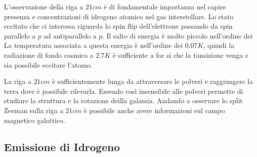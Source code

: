 L'osservazione della riga a $21cm$ \`e di fondamentale importanza nel capire presenza e concentrazioni di idrogeno atomico nel gas interstellare. Lo stato eccitato che ci interessa riguarda lo spin flip dell'elettrone passando da spin parallelo a $p$ ad antiparallelo a $p$. Il salto di energia \`e molto piccolo nell'ordine dei
La temperatura associata a questa energia \`e nell'ordine dei $0.07K$, quindi la radiazione di fondo cosmico a $2.7K$ \`e sufficiente a far si che la tansizione venga e sia possibile eccitare l'atomo.

La riga a $21cm$ \`e sufficientemente lunga da attraversare le polveri e raggiungere la terra dove \`e possibile rilevarla. Essendo cos\`i insensibile alle polveri permette di studiare la struttura e la rotazione deilla galassia. Andando a osservare lo split Zeeman sulla riga a $21cm$ \`e possibile anche avere informazioni sul campo magnetico galattico.

\subsection{Emissione di Idrogeno}





















